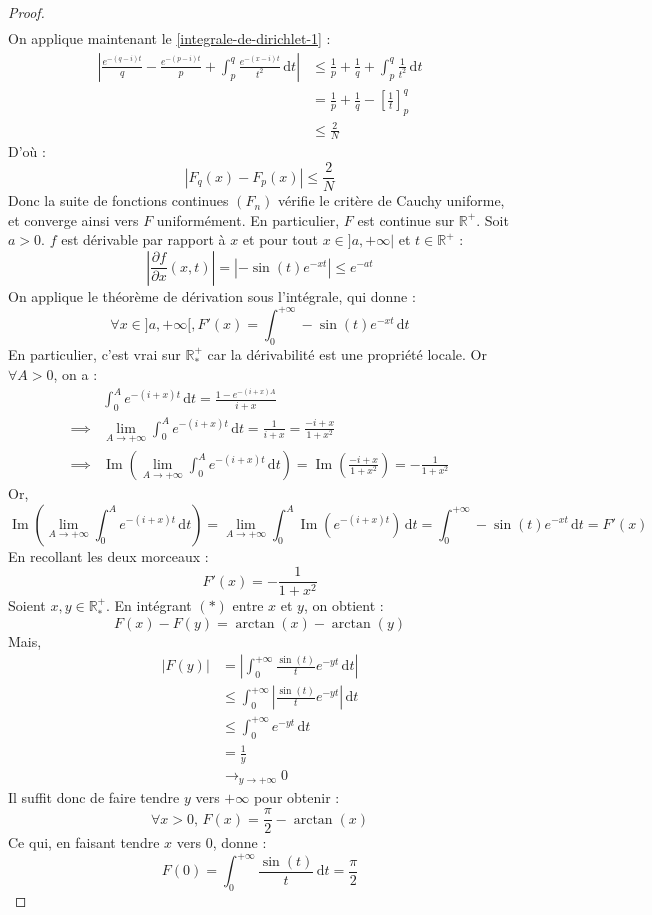\begin{proof}
\begin{align*}
    \end{align*}
    On applique maintenant le \cref{integrale-de-dirichlet-1} :
    \begin{align*}
      \left| \frac{e^{-(q-i)t}}{q} - \frac{e^{-(p-i)t}}{p} +  \int_p^q \frac{e^{-(x-i)t}}{t^2} \, \mathrm{d}t \right| &\leq \frac{1}{p} + \frac{1}{q} + \int_p^q \frac{1}{t^2} \, \mathrm{d}t \\
      &= \frac{1}{p} + \frac{1}{q} - \left[ \frac{1}{t} \right]^q_p \\
      &\leq \frac{2}{N}
    \end{align*}
    D'où :
    \[ |F_q(x) - F_p(x)| \leq \frac{2}{N} \]
    Donc la suite de fonctions continues $(F_n)$ vérifie le critère de Cauchy uniforme, et converge ainsi vers $F$ uniformément. En particulier, $F$ est continue sur $\mathbb{R}^+$.
    \newpar
    Soit $a > 0$. $f$ est dérivable par rapport à $x$ et pour tout $x \in ]a, +\infty|$ et $t \in \mathbb{R}^+$ :
    \[ \left| \frac{\partial f}{\partial x} (x, t) \right| = |-\sin(t) e^{-xt}| \leq e^{-at} \]
    On applique le théorème de dérivation sous l'intégrale, qui donne :
    \[ \forall x \in ]a, +\infty[, F'(x) = \int_0^{+\infty} -\sin(t) e^{-xt} \, \mathrm{d}t \]
    En particulier, c'est vrai sur $\mathbb{R}^+_*$ car la dérivabilité est une propriété locale. Or $\forall A > 0$, on a :
    \begin{align*}
      & \int_0^A e^{-(i+x)t} \, \mathrm{d}t = \frac{1-e^{-(i+x)A}}{i+x} \\
      \implies & \lim_{A \rightarrow +\infty} \int_0^A e^{-(i+x)t} \, \mathrm{d}t = \frac{1}{i+x} = \frac{-i+x}{1 + x^2} \\
      \implies & \operatorname{Im} \left( \lim_{A \rightarrow +\infty} \int_0^A e^{-(i+x)t} \, \mathrm{d}t \right) = \operatorname{Im} \left( \frac{-i+x}{1 + x^2} \right) = -\frac{1}{1 + x^2}
    \end{align*}
    Or,
    \[ \operatorname{Im} \left( \lim_{A \rightarrow +\infty} \int_0^A e^{-(i+x)t} \, \mathrm{d}t \right) = \lim_{A \rightarrow +\infty} \int_0^A \operatorname{Im} \left( e^{-(i+x)t} \right) \, \mathrm{d}t = \int_0^{+\infty} -\sin(t) e^{-xt} \, \mathrm{d}t = F'(x) \]
    En recollant les deux morceaux :
    \[ F'(x) = -\frac{1}{1+x^2} \tag{$*$} \]
    Soient $x, y \in \mathbb{R}^+_*$. En intégrant $(*)$ entre $x$ et $y$, on obtient :
    \[ F(x) - F(y) = \arctan(x) - \arctan(y) \]
    Mais,
    \begin{align*}
      |F(y)| &= \left| \int_0^{+\infty} \frac{\sin(t)}{t} e^{-yt} \, \mathrm{d}t \right| \\
      &\leq \int_0^{+\infty} \left| \frac{\sin(t)}{t} e^{-yt} \right| \, \mathrm{d}t \\
      &\leq \int_0^{+\infty} e^{-yt} \, \mathrm{d}t \\
      &= \frac{1}{y} \\
      &\longrightarrow_{y \rightarrow +\infty} 0
    \end{align*}
    Il suffit donc de faire tendre $y$ vers $+\infty$ pour obtenir :
    \[ \forall x > 0, \, F(x) = \frac{\pi}{2} - \arctan(x) \]
    Ce qui, en faisant tendre $x$ vers $0$, donne :
    \[ F(0) = \int_0^{+\infty} \frac{\sin(t)}{t} \, \mathrm{d}t = \frac{\pi}{2} \]
  \end{proof}

